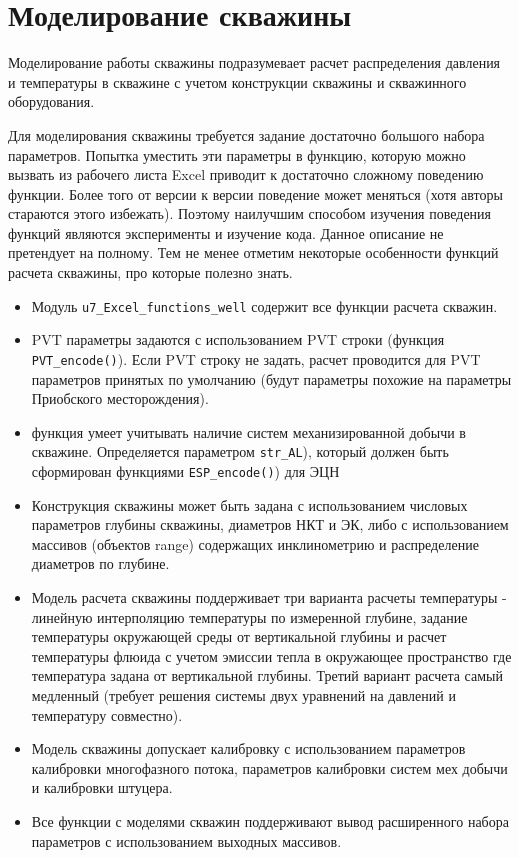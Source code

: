 \section{Моделирование скважины}
Моделирование работы скважины подразумевает расчет распределения давления и температуры в скважине с учетом конструкции скважины и скважинного оборудования. 

Для моделирования скважины требуется задание достаточно большого набора параметров. Попытка уместить эти параметры в функцию, которую можно вызвать из рабочего листа Excel приводит к достаточно сложному поведению функции. Более того от версии к версии поведение может меняться (хотя авторы стараются этого избежать). Поэтому наилучшим способом изучения поведения функций являются эксперименты и изучение кода. Данное описание не претендует на полному. Тем не менее отметим некоторые особенности функций расчета скважины, про которые полезно знать.

\begin{itemize}
	\item Модуль  \texttt{u7_Excel_functions_well} содержит все функции расчета скважин.
	\item PVT параметры задаются с использованием PVT строки (функция \texttt{PVT_encode()}). Если PVT строку не задать, расчет проводится для PVT параметров принятых по умолчанию (будут параметры похожие на параметры Приобского месторождения). 
	\item функция умеет учитывать наличие систем механизированной добычи в скважине. Определяется параметром  \texttt{str_AL}), который должен быть сформирован функциями \texttt{ESP_encode()}) для ЭЦН %
	\item  Конструкция скважины может быть задана с использованием числовых параметров глубины скважины, диаметров НКТ и ЭК, либо с использованием массивов (объектов range) содержащих инклинометрию и распределение диаметров по глубине. 
	\item  Модель расчета скважины поддерживает три варианта расчеты температуры - линейную интерполяцию температуры по измеренной глубине, задание температуры окружающей среды от вертикальной глубины и расчет температуры флюида с учетом эмиссии тепла в окружающее пространство где температура задана от вертикальной глубины. Третий вариант расчета самый медленный (требует решения системы двух уравнений на давлений и температуру совместно).
	\item  Модель скважины допускает калибровку с использованием параметров калибровки многофазного потока, параметров калибровки систем мех добычи и калибровки штуцера.
	\item  Все функции с моделями скважин поддерживают вывод расширенного набора параметров с использованием выходных массивов.
\end{itemize}

